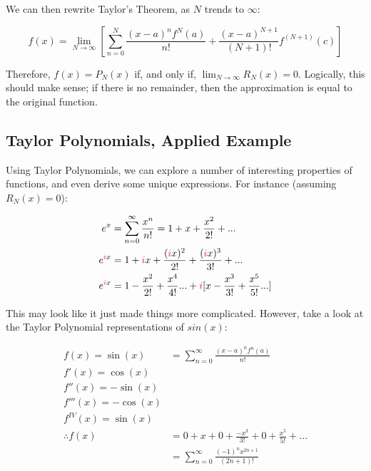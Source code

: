 \documentclass[12pt]{article}
\begin{document}

We can then rewrite Taylor's Theorem, as $N$ trends to $\infty$:

$$f(x) = \lim_{N\to\infty}[\sum_{n=0}^N \frac{(x-a)^n f^{N}(a)}{n!} + \frac{(x-a)^{N+1}}{(N+1)!} f^{(N+1)}(c)]$$

Therefore, $f(x) = P_N(x)$ if, and only if, $\lim_{N\to\infty} R_N(x) = 0$. Logically, this should make sense; if there is no remainder, then the approximation is equal to the original function.

\subsection{Taylor Polynomials, Applied Example}\label{sec:taylorcomplex}

Using Taylor Polynomials, we can explore a number of interesting properties of functions, and even derive some unique expressions. For instance (assuming $R_N(x) = 0$):

\begin{equation}
    \begin{split}
    e^x &= \sum_{n=0}^{\infty} \frac{x^n}{n!} = 1 + x + \frac{x^2}{2!} + ...\\
    e^{\textcolor{red}{i}x} &= 1 + \textcolor{red}{i}x + \frac{(\textcolor{red}{i}x)^2}{2!} + \frac{(\textcolor{red}{i}x)^3}{3!} + ...\\
    e^{\textcolor{red}{i}x} &= 1 -\frac{x^2}{2!} + \frac{x^4}{4!}...+\textcolor{red}{i}[x - \frac{x^3}{3!} + \frac{x^5}{5!}...]\\
    \end{split}
\end{equation}

This may look like it just made things more complicated. However, take a look at the Taylor Polynomial representations of $sin(x)$:

\begin{equation}
    \begin{split}
        f(x) = \sin(x) &= \sum_{n=0}^{\infty} \frac{(x-a)^n f^n(a)}{n!}\\
        f'(x) = \cos(x)\\
        f''(x) = -\sin(x)\\
        f'''(x) = -\cos(x)\\
        f^{IV}(x) = \sin(x)\\
        \therefore f(x) &= 0 + x + 0 + \frac{-x^3}{3!} + 0 + \frac{x^5}{5!} + ...\\
        &= \sum_{n=0}^{\infty}\frac{(-1)^n x^{2n+1}}{(2n+1)!}\\
    \end{split}
\end{equation}
\end{document}
